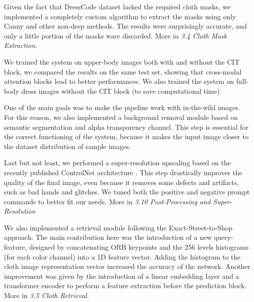 Given the fact that DressCode dataset lacked the required cloth masks, we implemented a completely custom algorithm to extract the masks using only Canny and other non-deep methods. The results were surprisingly accurate, and only a little portion of the masks ware discarded. More in \textit{3.4 Cloth Mask Extraction}.

We trained the system on upper-body images both with and without the CIT block, we compared the results on the same test set, showing that cross-modal attention blocks lead to better performances. 
We also trained the system on full-body dress images without the CIT block (to save computational time). 

One of the main goals was to make the pipeline work with in-the-wild images. For this reason, we also implemented a background removal module based on semantic segmentation and alpha transparency channel. This step is essential for the correct functioning of the system, because it makes the input image closer to the dataset distribution of sample images.

Last but not least, we performed a super-resolution upscaling based on the recently published ControlNet architecture \cite{controlnet}. This step drastically improves the quality of the final image, even because it removes some defects and artifacts, such as bad hands and glitches. We tuned both the positive and negative prompt commands  to better fit our needs. More in \textit{3.10 Post-Processing and Super-Resolution}

We also implemented a retrieval module following the Exact-Street-to-Shop \cite{stree2shop} approach. The main contribution here was the introduction of a new query-feature, designed by concatenating ORB keypoints and the 256 levels histograms (for each color channel) into a 1D feature vector. Adding the histogram to the cloth image representation vector increased the accuracy of the network. Another improvement was given by the introduction of a linear embedding layer and a transformer encoder to perform a feature extraction before the prediction block. More in \textit{3.5 Cloth Retrieval}.

\hfill




